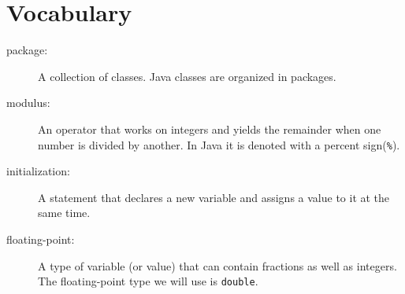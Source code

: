 \section{Vocabulary}

\begin{description}

\item[package:]  A collection of classes.  Java
classes are organized in packages.

\item[modulus:]  An operator that works on integers and yields
the remainder when one number is divided by another.  In Java
it is denoted with a percent sign({\tt \%}).

\item[initialization:]  A statement that declares a new variable
and assigns a value to it at the same time.

\item[floating-point:] A type of variable (or value) that can contain
fractions as well as integers.  The floating-point type we will
use is {\tt double}.

\end{description}
